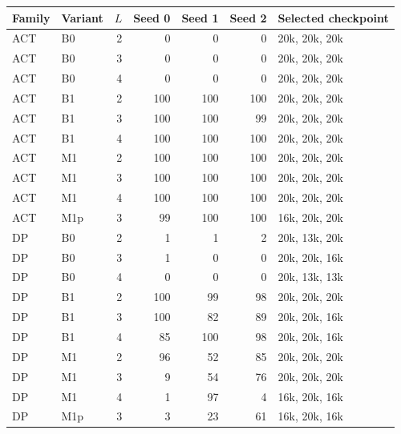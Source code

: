 \begin{tabular}{llrrrrl}
\toprule
Family & Variant & $L$ & Seed 0 & Seed 1 & Seed 2 & Selected checkpoint \\
\midrule
ACT & B0 & 2 & 0 & 0 & 0 & 20k, 20k, 20k \\
ACT & B0 & 3 & 0 & 0 & 0 & 20k, 20k, 20k \\
ACT & B0 & 4 & 0 & 0 & 0 & 20k, 20k, 20k \\
ACT & B1 & 2 & 100 & 100 & 100 & 20k, 20k, 20k \\
ACT & B1 & 3 & 100 & 100 & 99 & 20k, 20k, 20k \\
ACT & B1 & 4 & 100 & 100 & 100 & 20k, 20k, 20k \\
ACT & M1 & 2 & 100 & 100 & 100 & 20k, 20k, 20k \\
ACT & M1 & 3 & 100 & 100 & 100 & 20k, 20k, 20k \\
ACT & M1 & 4 & 100 & 100 & 100 & 20k, 20k, 20k \\
ACT & M1p & 3 & 99 & 100 & 100 & 16k, 20k, 20k \\
DP & B0 & 2 & 1 & 1 & 2 & 20k, 13k, 20k \\
DP & B0 & 3 & 1 & 0 & 0 & 20k, 20k, 16k \\
DP & B0 & 4 & 0 & 0 & 0 & 20k, 13k, 13k \\
DP & B1 & 2 & 100 & 99 & 98 & 20k, 20k, 20k \\
DP & B1 & 3 & 100 & 82 & 89 & 20k, 20k, 16k \\
DP & B1 & 4 & 85 & 100 & 98 & 20k, 20k, 16k \\
DP & M1 & 2 & 96 & 52 & 85 & 20k, 20k, 20k \\
DP & M1 & 3 & 9 & 54 & 76 & 20k, 20k, 20k \\
DP & M1 & 4 & 1 & 97 & 4 & 16k, 20k, 16k \\
DP & M1p & 3 & 3 & 23 & 61 & 16k, 20k, 16k \\
\bottomrule
\end{tabular}
